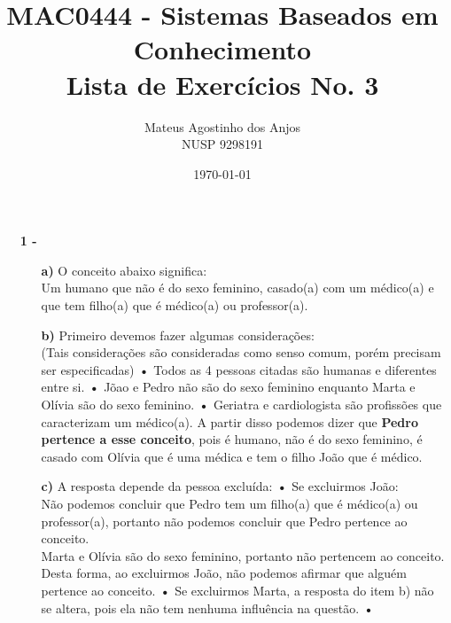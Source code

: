 \documentclass[12pt]{article}
\title{MAC0444 - Sistemas Baseados em Conhecimento \\
Lista de Exercícios No. 3
}
\author{Mateus Agostinho dos Anjos\\NUSP 9298191}
\date{\today}
\begin{document}
	\maketitle
	\begin{itemize}
		\item[\textbf{1 -}]
			\hfill\newline
			\begin{itemize}
				\item[\textbf{a) }]
					\hfill\newline
					O conceito abaixo significa:\\
					Um humano que não é do sexo feminino, casado(a) com um médico(a) e que tem filho(a) que
					é médico(a) ou professor(a). 
				\item[\textbf{b) }]
					\hfill\newline
					Primeiro devemos fazer algumas considerações:\\
					(Tais considerações são consideradas como senso comum, porém
					precisam ser especificadas)
					\subitem\textbf{•}
					Todos as 4 pessoas citadas são humanas e diferentes entre si.
					\subitem\textbf{•}
					Jõao e Pedro não são do sexo feminino enquanto Marta e Olívia são do sexo feminino.
					\subitem\textbf{•}
					Geriatra e cardiologista são profissões que caracterizam um médico(a).
					\newline
					A partir disso podemos dizer que \textbf{Pedro pertence a esse conceito}, pois é humano,
					não é do sexo feminino, é casado com Olívia que é uma médica e tem o filho João que é
					médico.
					\newpage
				\item[\textbf{c) }]
					\hfill\newline
					A resposta depende da pessoa excluída:
					\newline
					\subitem\textbf{•}
					Se excluirmos João:\\
					Não podemos concluir que Pedro tem um filho(a) que é médico(a) ou
					professor(a), portanto não podemos concluir que Pedro pertence ao conceito.\\
					Marta e Olívia são do sexo feminino, portanto não pertencem ao conceito.\\
					Desta forma, ao excluirmos João, não podemos afirmar que alguém pertence ao
					conceito.
					\newline
					\subitem\textbf{•}
					Se excluirmos Marta, a resposta do item b) não se altera, pois ela não tem
					nenhuma influência na questão.
					\newline
					\subitem\textbf{•}

\end{itemize}
\end{itemize}
\end{document}
